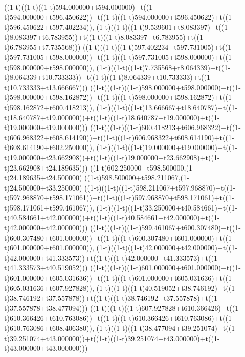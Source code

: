 ((1-t)((1-t)((1-t)594.000000+t594.000000)+t((1-t)594.000000+t596.450622))+t((1-t)((1-t)594.000000+t596.450622)+t((1-t)596.450622+t597.402234)),                                     (1-t)((1-t)((1-t)9.539601+t8.083397)+t((1-t)8.083397+t6.783955))+t((1-t)((1-t)8.083397+t6.783955)+t((1-t)6.783955+t7.735568)))
((1-t)((1-t)((1-t)597.402234+t597.731005)+t((1-t)597.731005+t598.000000))+t((1-t)((1-t)597.731005+t598.000000)+t((1-t)598.000000+t598.000000)),                                     (1-t)((1-t)((1-t)7.735568+t8.064339)+t((1-t)8.064339+t10.733333))+t((1-t)((1-t)8.064339+t10.733333)+t((1-t)10.733333+t13.666667)))
((1-t)((1-t)((1-t)598.000000+t598.000000)+t((1-t)598.000000+t598.162872))+t((1-t)((1-t)598.000000+t598.162872)+t((1-t)598.162872+t600.418213)),                                     (1-t)((1-t)((1-t)13.666667+t18.640787)+t((1-t)18.640787+t19.000000))+t((1-t)((1-t)18.640787+t19.000000)+t((1-t)19.000000+t19.000000)))
((1-t)((1-t)((1-t)600.418213+t606.968322)+t((1-t)606.968322+t608.614190))+t((1-t)((1-t)606.968322+t608.614190)+t((1-t)608.614190+t602.250000)),                                     (1-t)((1-t)((1-t)19.000000+t19.000000)+t((1-t)19.000000+t23.662908))+t((1-t)((1-t)19.000000+t23.662908)+t((1-t)23.662908+t24.189635)))
((1-t)602.250000+t598.500000,(1-t)24.189635+t24.500000)
((1-t)598.500000+t598.211067,(1-t)24.500000+t33.250000)
((1-t)((1-t)((1-t)598.211067+t597.968870)+t((1-t)597.968870+t598.171061))+t((1-t)((1-t)597.968870+t598.171061)+t((1-t)598.171061+t599.461067)),                                     (1-t)((1-t)((1-t)33.250000+t40.584661)+t((1-t)40.584661+t42.000000))+t((1-t)((1-t)40.584661+t42.000000)+t((1-t)42.000000+t42.000000)))
((1-t)((1-t)((1-t)599.461067+t600.307480)+t((1-t)600.307480+t601.000000))+t((1-t)((1-t)600.307480+t601.000000)+t((1-t)601.000000+t601.000000)),                                     (1-t)((1-t)((1-t)42.000000+t42.000000)+t((1-t)42.000000+t41.333573))+t((1-t)((1-t)42.000000+t41.333573)+t((1-t)41.333573+t40.519052)))
((1-t)((1-t)((1-t)601.000000+t601.000000)+t((1-t)601.000000+t605.031636))+t((1-t)((1-t)601.000000+t605.031636)+t((1-t)605.031636+t607.927828)),                                     (1-t)((1-t)((1-t)40.519052+t38.746192)+t((1-t)38.746192+t37.557878))+t((1-t)((1-t)38.746192+t37.557878)+t((1-t)37.557878+t38.477094)))
((1-t)((1-t)((1-t)607.927828+t610.366426)+t((1-t)610.366426+t610.763086))+t((1-t)((1-t)610.366426+t610.763086)+t((1-t)610.763086+t608.406380)),                                     (1-t)((1-t)((1-t)38.477094+t39.251074)+t((1-t)39.251074+t43.000000))+t((1-t)((1-t)39.251074+t43.000000)+t((1-t)43.000000+t43.000000)))
